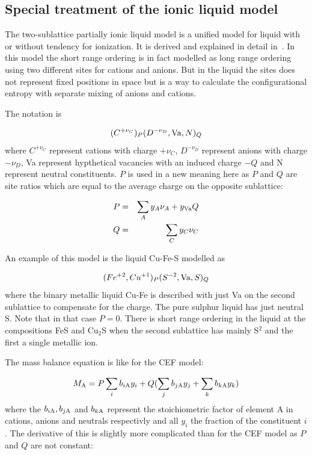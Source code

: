 \documentclass[12pt]{article}
\begin{document}
\subsection{Special treatment of the ionic liquid model}

The two-sublattice partially ionic liquid model is a unified model for
liquid with or without tendency for ionization.  It is derived and
explained in detail in~\cite{84Hil}.  In this model the short range
ordering is in fact modelled as long range ordering using two
different sites for cations and anions.  But in the liquid the sites
does not represent fixed positions in space but is a way to calculate
the configurational entropy with separate mixing of anions and cations.

The notation is

\begin{equation}
(C^{+\nu_C})_P(D^{-\nu_D}, {\rm Va}, N)_Q
\end{equation}
where $C^{+\nu_C}$ represent cations with charge $+\nu_C$,
$D^{-\nu_D}$ represent anions with charge $-\nu_D$, Va represent
hypthetical vacancies with an induced charge $-Q$ and N represent
neutral constituents.  $P$ is used in a new meaning here as $P$ and
$Q$ are site ratios which are equal to the average charge on the
opposite sublattice:

\begin{eqnarray}
P &=& \sum_A y_A \nu_A + y_{\rm Va} Q\\
Q &=& \sum_C y_C \nu_C
\end{eqnarray}

An example of this model is the liquid Cu-Fe-S modelled as

\begin{equation}
(Fe^{+2}, Cu^{+1})_P(S^{-2}, {\rm Va}, S)_Q
\end{equation}
where the binary metallic liquid Cu-Fe is described with just Va on
the second sublattice to compensate for the charge.  The pure sulphur
liquid has just neutral S.  Note that in that case $P=0$.  There is
short range ordering in the liquid at the compositions FeS and Cu$_2$S
when the second sublattice has mainly S$^{2}$ and the first a single
metallic ion.

The mass balance equation is like for the CEF model:

\begin{eqnarray}
M_{\rm A} = P\sum_i b_{i\rm A}y_i+Q(\sum_j b_{j\rm A} y_j+\sum_k b_{k\rm A}y_k)
\end{eqnarray}
where the $b_{i\rm A}, b_{j\rm A}$ and $b_{k\rm A}$ represent the
stoichiometric factor of element A in cations, anions and neutrals
respectivly and all $y_i$ the fraction of the constituent $i$.  The
derivative of this is slightly more complicated than for the CEF model
as $P$ and $Q$ are not constant:
\end{document}

